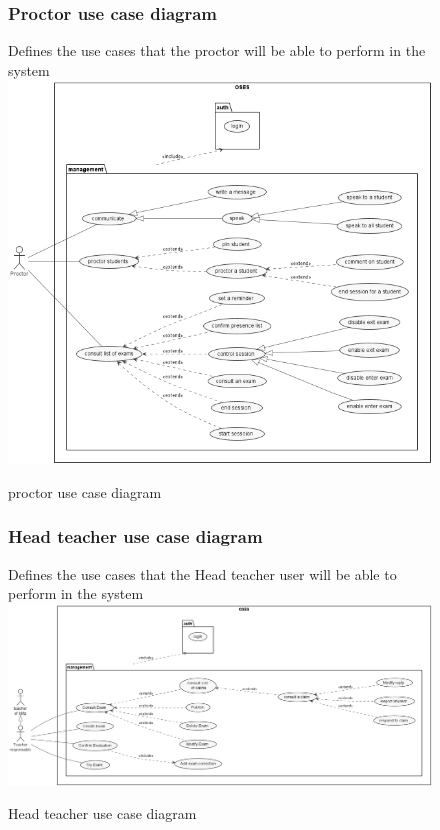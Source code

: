 \documentclass[]{uc2pfecaneva}
\begin{document}
    \begin{figure}
        \subsubsection{Proctor use case diagram}
        \raggedright{Defines the use cases that the proctor will be able to perform in the system}
        \includegraphics[width=\textwidth]{images/proctor_UCD}
        \caption{proctor use case diagram}
    \end{figure}


    \begin{figure}
        \subsubsection{Head teacher use case diagram}
        \raggedright{Defines the use cases that the Head teacher user will be able to perform in the system}
        \includegraphics[width=450pt]{images/Module_Teacher}
        \caption{Head teacher use case diagram}
    \end{figure}
\end{document}
